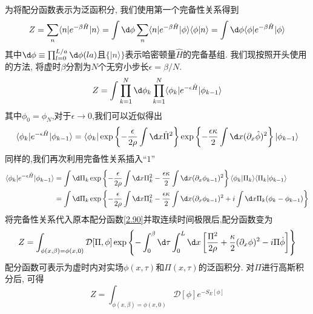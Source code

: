 为将配分函数表示为泛函积分, 我们使用第一个完备性关系得到
\begin{equation}
    Z=\sum_n\langle n|e^{-\beta\hat{H}}|n\rangle=\int \d\phi\sum_n\langle n|e^{-\beta\hat{H}}|\phi\rangle\langle\phi|n\rangle=\int \d\phi\langle\phi|e^{-\beta\hat{H}}|\phi\rangle
\end{equation}
其中$\d\phi\equiv\prod_{l=0}^{L/a}\d\phi(la)$且$\{|n\rangle\}$表示哈密顿量$\hat{H}$的完备基组. 我们现按照开头使用的方法, 将虚时$\beta$分割为$N$个无穷小步长$\epsilon=\beta/N$.
\begin{equation}\label{2.90}
    Z=\int\prod_{k=1}^N\d\phi_k\prod_{k=1}^N\langle\phi_k|e^{-\epsilon\hat{H}}|\phi_{k-1}\rangle
\end{equation}
其中$\phi_0=\phi_N$,对于$\epsilon\to0$,我们可以近似得出
\begin{equation}
    \langle\phi_k|e^{-\epsilon\hat{H}}|\phi_{k-1}\rangle=\langle\phi_k|\exp\left\{-\frac{\epsilon}{2\rho}\int \dx\hat{\Pi}^2\right\}\exp\left\{-\frac{\epsilon\kappa}{2}\int \dx(\partial_x\hat{\phi})^2\right\}|\phi_{k-1}\rangle
\end{equation}
同样的,我们再次利用完备性关系插入``$ 1 $''
\begin{equation}
    \begin{aligned}\langle\phi_k|e^{-\epsilon\hat{H}}|\phi_{k-1}\rangle&=\int \d\Pi_k\exp\left\{-\frac{\epsilon}{2\rho}\int \dx\Pi_k^2-\frac{\epsilon\kappa}{2}\int \dx(\partial_x\phi_{k-1})^2\right\}\langle\phi_k|\Pi_k\rangle\langle\Pi_k|\phi_{k-1}\rangle\\&=\int \d\Pi_k\exp\left\{-\frac{\epsilon}{2\rho}\int \dx\Pi_k^2-\frac{\epsilon\kappa}{2}\int \dx(\partial_x\phi_{k-1})^2+i\int \dx\Pi_k(\phi_k-\phi_{k-1})\right\}
    \end{aligned}
\end{equation}
将完备性关系代入原本配分函数\ref{2.90}并取连续时间极限后,配分函数变为
\begin{equation}
    Z=\int_{\phi(x,\beta)=\phi(x,0)}\mathcal{D}[\Pi,\phi]\exp\left\{-\int_0^\beta \d\tau\int_0^L\dx\left[\frac{\Pi^2}{2\rho}+\frac{\kappa}{2}(\partial_x\phi)^2-i\Pi\dot{\phi}\right]\right\}
\end{equation}
配分函数可表示为虚时内对实场$\phi(x,\tau)$和$\Pi(x,\tau)$的泛函积分. 对$\Pi$进行高斯积分后, 可得  
\begin{equation}
    Z=\int_{\phi(x,\beta)=\phi(x,0)}\mathcal{D}[\phi]e^{-S_E[\phi]}
\end{equation}
